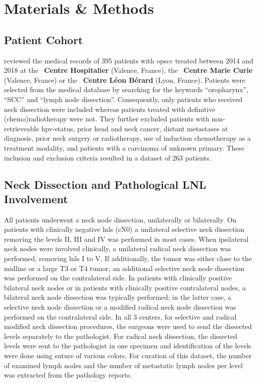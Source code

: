 \documentclass[\relativeRoot/main.tex]{subfiles}
\begin{document}
\section{Materials \& Methods}
\label{sec:dataset_clb:methods}

\subsection*{Patient Cohort}
\label{subsec:dataset_clb:methods:cohort}

 reviewed the medical records of 395 patients with \gls{opscc} treated between 2014 and 2018 at the ~\textbf{Centre Hospitalier} (Valence, France), the ~\textbf{Centre Marie Curie} (Valence, France) or the ~\textbf{Centre Léon Bérard} (Lyon, France). Patients were selected from the medical database by searching for the keywords ``oropharynx'', ``SCC'' and ``lymph node dissection''. Consequently, only patients who received neck dissection were included whereas patients treated with definitive (chemo)radiotherapy were not. They further excluded patients with non-retrieveable \gls{hpv}-status, prior head and neck cancer, distant metastases at diagnosis, prior neck surgery or radiotherapy, use of induction chemotherapy as a treatment modality, and patients with a carcinoma of unknown primary. These inclusion and exclusion criteria resulted in a dataset of 263 patients.

\subsection*{Neck Dissection and Pathological LNL Involvement}
\label{subsec:dataset_clb:methods:dissection}

All patients underwent a neck node dissection, unilaterally or bilaterally. On patients with clinically negative \glspl{lnl} (cN0) a unilateral selective neck dissection removing the levels II, III and IV was performed in most cases. When ipsilateral neck nodes were involved clinically, a unilateral radical neck dissection was performed, removing \glspl{lnl} I to V. If additionally, the tumor was either close to the midline or a large T3 or T4 tumor, an additional selective neck node dissection was performed on the contralateral side. In patients with clinically positive bilateral neck nodes or in patients with clinically positive contralateral nodes, a bilateral neck node dissection was typically performed; in the latter case, a selective neck node dissection or a modified radical neck node dissection was performed on the contralateral side. In all 3 centers, for selective and radical modified neck dissection procedures, the surgeons were used to send the dissected levels separately to the pathologist. For radical neck dissection, the dissected levels were sent to the pathologist in one specimen and identification of the levels were done using suture of various colors. For curation of this dataset, the number of examined lymph nodes and the number of metastatic lymph nodes per level was extracted from the pathology reports.
\end{document}
